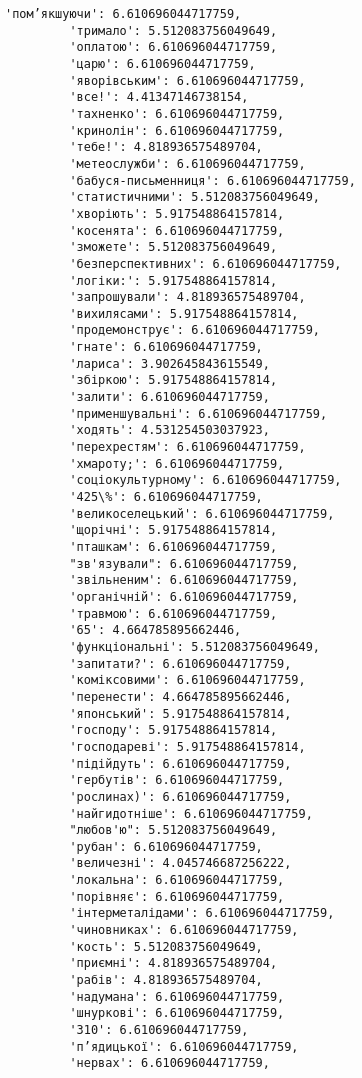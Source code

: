 \documentclass[11pt]{article}
\begin{document}
\begin{Verbatim}[commandchars=\\\{\}]
         'пом’якшуючи': 6.610696044717759,
         'тримало': 5.512083756049649,
         'оплатою': 6.610696044717759,
         'царю': 6.610696044717759,
         'яворівським': 6.610696044717759,
         'все!': 4.41347146738154,
         'тахненко': 6.610696044717759,
         'кринолін': 6.610696044717759,
         'тебе!': 4.818936575489704,
         'метеослужби': 6.610696044717759,
         'бабуся-письменниця': 6.610696044717759,
         'статистичними': 5.512083756049649,
         'хворіють': 5.917548864157814,
         'косенята': 6.610696044717759,
         'зможете': 5.512083756049649,
         'безперспективних': 6.610696044717759,
         'логіки:': 5.917548864157814,
         'запрошували': 4.818936575489704,
         'вихилясами': 5.917548864157814,
         'продемонструє': 6.610696044717759,
         'гнате': 6.610696044717759,
         'лариса': 3.902645843615549,
         'збіркою': 5.917548864157814,
         'залити': 6.610696044717759,
         'применшувальні': 6.610696044717759,
         'ходять': 4.531254503037923,
         'перехрестям': 6.610696044717759,
         'хмароту;': 6.610696044717759,
         'соціокультурному': 6.610696044717759,
         '425\%': 6.610696044717759,
         'великоселецький': 6.610696044717759,
         'щорічні': 5.917548864157814,
         'пташкам': 6.610696044717759,
         "зв'язували": 6.610696044717759,
         'звільненим': 6.610696044717759,
         'органічній': 6.610696044717759,
         'травмою': 6.610696044717759,
         '65': 4.664785895662446,
         'функціональні': 5.512083756049649,
         'запитати?': 6.610696044717759,
         'коміксовими': 6.610696044717759,
         'перенести': 4.664785895662446,
         'японський': 5.917548864157814,
         'господу': 5.917548864157814,
         'господареві': 5.917548864157814,
         'підійдуть': 6.610696044717759,
         'гербутів': 6.610696044717759,
         'рослинах)': 6.610696044717759,
         'найгидотніше': 6.610696044717759,
         "любов'ю": 5.512083756049649,
         'рубан': 6.610696044717759,
         'величезні': 4.045746687256222,
         'локальна': 6.610696044717759,
         'порівняє': 6.610696044717759,
         'інтерметалідами': 6.610696044717759,
         'чиновниках': 6.610696044717759,
         'кость': 5.512083756049649,
         'приємні': 4.818936575489704,
         'рабів': 4.818936575489704,
         'надумана': 6.610696044717759,
         'шнуркові': 6.610696044717759,
         '310': 6.610696044717759,
         'п’ядицької': 6.610696044717759,
         'нервах': 6.610696044717759,

\end{Verbatim}
\end{document}

